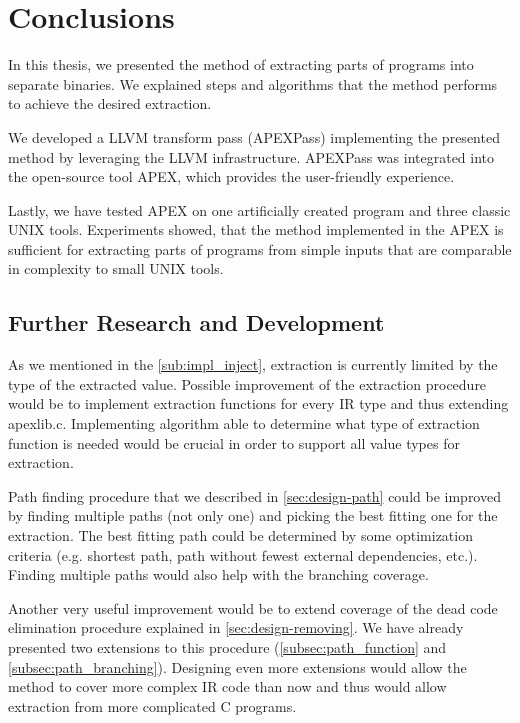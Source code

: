\documentclass[12pt, twoside]{fithesis2}
\renewcommand{\_}{\leavevmode \kern0.07em\vbox{\hrule width0.4em}}
\begin{document}
\chapter{Conclusions}
\label{chap:conclusions}

In this thesis, we presented the method of extracting parts of programs into
separate binaries. We explained steps and algorithms that the method
performs to achieve the desired extraction.

We developed a LLVM transform pass (APEXPass) implementing the presented
method by leveraging the LLVM infrastructure.
APEXPass was integrated into the open-source tool APEX, which provides the
user-friendly experience.

Lastly, we have tested APEX on one artificially created program and three
classic UNIX tools. Experiments showed, that the method implemented in the APEX
is sufficient for extracting parts of programs from simple inputs that are
comparable in complexity to small UNIX tools.



\section{Further Research and Development}
\label{sec:conclusions-next}


As we mentioned in the \autoref{sub:impl_inject}, extraction is currently
limited by the type of the extracted value.
Possible improvement of the extraction procedure would be to implement
extraction functions for every IR type and thus extending apexlib.c.
Implementing algorithm able to determine what type of extraction
function is needed would be crucial in order to support all value types
for extraction.

Path finding procedure that we described in \autoref{sec:design-path} could be
improved by finding multiple paths (not only one) and picking the best fitting
one for the extraction. The best fitting path could be determined by some
optimization criteria (e.g. shortest path, path without fewest external
dependencies, etc.). Finding multiple paths would also help with the branching
coverage.

Another very useful improvement would be to extend coverage of the dead
code elimination procedure explained in \autoref{sec:design-removing}.
We have already presented two extensions to this procedure
(\autoref{subsec:path_function} and \autoref{subsec:path_branching}).
Designing even more extensions would allow the method to cover more
complex IR code than now and thus would allow extraction from more complicated
C programs.
\end{document}
